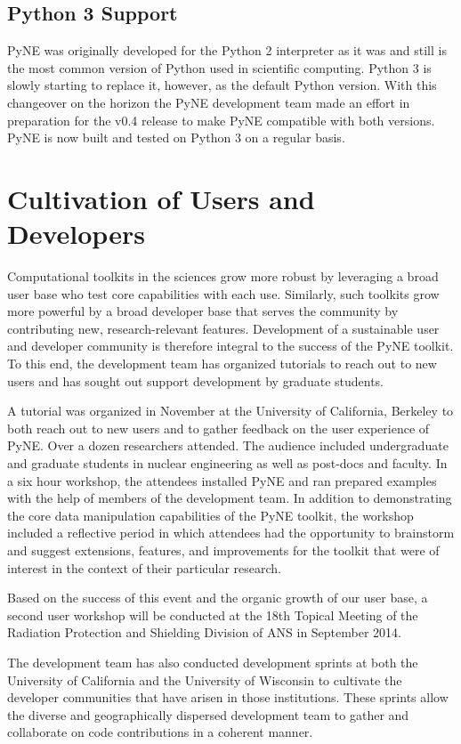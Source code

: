 \documentclass{anstrans}
\begin{document}
\subsection{Python 3 Support}

PyNE was originally developed for the Python 2 interpreter as it was 
and still is the most common version of Python used in scientific computing. 
Python 3 is slowly starting to replace it, however, as the default Python 
version. With this changeover on the horizon the PyNE development team 
made an effort in preparation for the v0.4 release to make PyNE compatible 
with both versions. PyNE is now built and tested on Python 3 on a regular basis.


\section{Cultivation of Users and Developers} 
Computational toolkits in the sciences grow more robust by leveraging a broad user base 
who test core capabilities with each use. Similarly, such toolkits grow more 
powerful by a broad developer base that serves the community by contributing 
new, research-relevant features. Development of a sustainable user and 
developer community is therefore integral to the success of the PyNE toolkit. 
To this end, the development team has organized tutorials to reach out to new 
users and has sought out support development by graduate students.

A tutorial was organized in November at the University of California, Berkeley 
to both reach out to new users and to gather feedback on the user experience of 
PyNE. Over a dozen researchers attended. The audience included undergraduate 
and graduate students in nuclear engineering as well as post-docs and faculty. 
In a six hour workshop, the attendees installed PyNE and ran prepared examples 
with the help of members of the development team. In addition to demonstrating 
the core data manipulation capabilities of the PyNE toolkit, the workshop 
included a reflective period in which attendees had the opportunity to 
brainstorm and suggest extensions, features, and improvements for the toolkit 
that were of interest in the context of their particular research.

Based on the success of this event and the organic growth of our user base, a 
second user workshop will be conducted at the 18th Topical Meeting of the 
Radiation Protection and Shielding Division of ANS in September 2014.

The development team has also conducted development sprints at both the 
University of California and the University of Wisconsin to cultivate the 
developer communities that have arisen in those institutions. These sprints 
allow the diverse and geographically dispersed development team to gather and 
collaborate on code contributions in a coherent manner.
\end{document}
